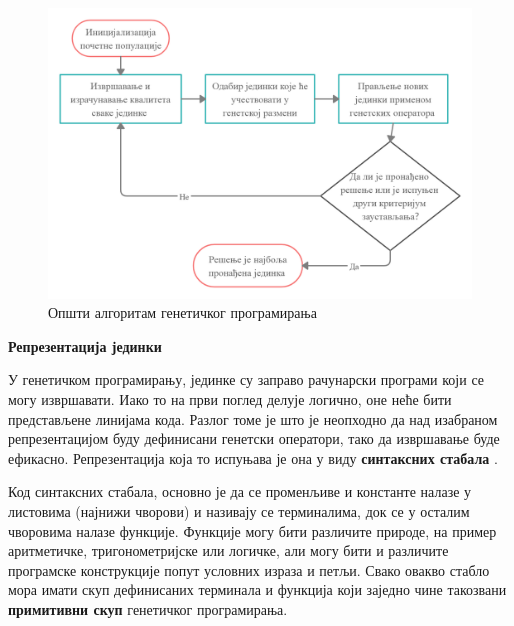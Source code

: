\documentclass[a4paper]{article}
\begin{document}
\begin{figure}[h!]
    \begin{center}
        \includegraphics[scale=0.22]{opstiAlgoritam.png}
    \end{center}
    \caption{Општи алгоритам генетичког програмирања}
    \label{fig:kontrola_toka}
\end{figure}

\bigskip
\noindent
\textbf{\large Репрезентација јединки}\newline

У генетичком програмирању, јединке су заправо рачунарски програми који се могу извршавати. Иако то на први поглед делује логично, оне неће бити представљене линијама кода. Разлог томе је што је неопходно да над изабраном репрезентацијом буду дефинисани генетски оператори, тако да извршавање буде ефикасно. Репрезентација која то испуњава је она у виду \textbf{синтаксних стабала} \cite{synTrees}.\newline

Код синтаксних стабала, основно је да се променљиве и константе налазе у листовима (најнижи чворови) и називају се терминалима, док се у осталим чворовима налазе функције. Функције могу бити различите природе, на пример аритметичке, тригонометријске или логичке, али могу бити и различите програмске конструкције попут условних израза и петљи. Свако овакво стабло мора имати скуп дефинисаних терминала и функција који заједно чине такозвани \textbf{примитивни скуп} генетичког програмирања. 
\end{document}

